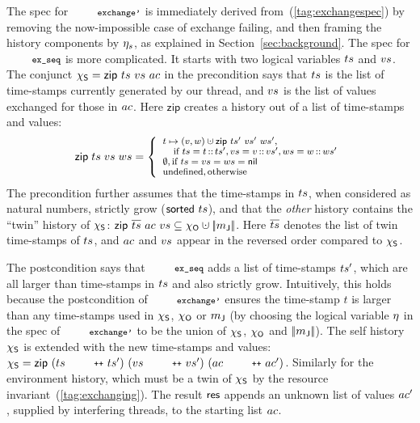 The spec for $\esc{exchange'}$ is immediately derived
from~(\ref{tag:exchangespec}) by removing the now-impossible case of
exchange failing, and then framing the history components by $\eta_s$,
as explained in Section~\ref{sec:background}.
%
The spec for $\esc{ex\_seq}$ is more complicated.  It starts with two
logical variables ${ts}$ and ${vs}$. The conjunct
$\chi_{\mathsf{S}} = \mathsf{zip}~{ts}~{vs}~{ac}$ in the precondition says that
${ts}$ is the list of time-stamps currently generated by our thread,
and ${vs}$ is the list of values exchanged for those in ${ac}$. Here
$\mathsf{zip}$ creates a history out of a list of time-stamps and
values:
%
\[
{\small{
\mathsf{zip}~ts~vs~ws = \left\{%
\begin{array}{l}
t \mapsto (v, w) \hunion \mathsf{zip}~\ts'~\vvs'~\ws', \\
\hphantom{\emptyset,}\ \mbox{if $\ts=t\,{::}\,\ts', \vvs=v\,{::}\,\vvs', \ws=w\,{::}\,\ws'$}\\
\emptyset, \mbox{if $\ts = \vvs = \ws = \mathsf{nil}$}\\
\mbox{undefined}, \mbox{otherwise}
\end{array}\right.
}}
\]
%
The precondition further assumes that the time-stamps in ${ts}$, when
considered as natural numbers, strictly grow ($\mathsf{sorted}\ {ts}$), and
that the \emph{other} history contains the ``twin'' history of
$\chi_{\mathsf{S}}$: $\mathsf{zip}~\overline{\ts}~\acc~\vvs \subseteq \histo
\hunion \mygather{\pending}$. Here $\overline{{ts}}$ denotes the list
of twin time-stamps of ${ts}$, and ${ac}$ and ${vs}$ appear in the
reversed order compared to $\chi_{\mathsf{S}}$.

The postcondition says that $\esc{ex\_seq}$ adds a list of time-stamps
${ts}'$, which are all larger than time-stamps in ${ts}$ and also
strictly grow. Intuitively, this holds because the postcondition of
$\esc{exchange'}$ ensures the time-stamp $t$ is larger than any
time-stamps used in $\chi_{\mathsf{S}}$, $\chi_{\mathsf{O}}$ or ${m_{\mathsf{J}}}$ (by choosing the
logical variable $\eta$ in the spec of $\esc{exchange'}$ to be the
union of $\chi_{\mathsf{S}}$, $\chi_{\mathsf{O}}$ and $|\!|{{m_{\mathsf{J}}}}|\!|$). The self
history $\chi_{\mathsf{S}}$ is extended with the new time-stamps and values:
$\hists =
\mathsf{zip}~(\ts~\esc{++}~\ts')~(\vvs~\esc{++}~\vvs')~(\acc~\esc{++}~\acc')$. Similarly
for the environment history, which must be a twin of $\chi_{\mathsf{S}}$ by the
resource invariant~(\ref{tag:exchanging}). The result $\mathsf{res}$ appends
an unknown list of values ${ac}'$, supplied by interfering threads, to
the starting list ${ac}$.

